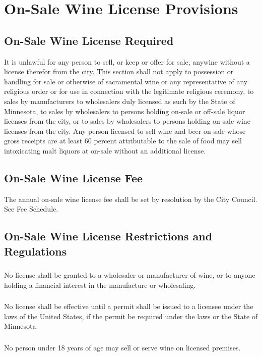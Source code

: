 
\setcounter{section}{99}
\section{On-Sale Wine License Provisions}
\subsection{On-Sale Wine License Required}
It is unlawful for any person to sell, or keep or offer for sale, anywine without a license therefor from the city. This section shall not apply to possession or handling for sale or otherwise of sacramental wine or any representative of any religious order or for use in connection with the legitimate religious ceremony, to sales by manufacturers to wholesalers duly licensed as such by the State of Minnesota, to sales by wholesalers to persons holding on-sale or off-sale liquor licenses from the city, or to sales by wholesalers to persons holding on-sale wine licenses from the city. Any person licensed to sell wine and beer on-sale whose gross receipts are at least 60 percent attributable to the sale of food may sell intoxicating malt liquors at on-sale without an additional license.
\subsection{On-Sale Wine License Fee}
The annual on-sale wine license fee shall be set by resolution by the City Council. See Fee Schedule.
\subsection{On-Sale Wine License Restrictions and Regulations}
\subsubsection{}
No license shall be granted to a wholesaler or manufacturer of wine, or to anyone holding a financial interest in the manufacture or wholesaling.
\subsubsection{}
No license shall be effective until a permit shall be issued to a licensee under the laws of the United States, if the permit be required under the laws or the State of Minnesota.
\subsubsection{}
No person under 18 years of age may sell or serve wine on licensed premises.
